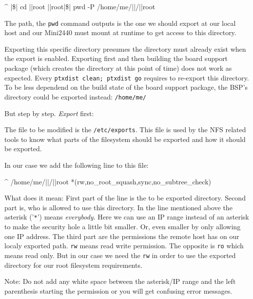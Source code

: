 \begin{ptxshell}[escapechar=|]{^}
|\$| cd |\ptxdistPlatformDir |root
|\ptxdistPlatformDir |root|\$| pwd -P
/home/me/|\ptxdistBSPName |/|\ptxdistPlatformDir |root
\end{ptxshell}

The path, the \texttt{pwd} command outputs is the one we should export at our local
host and our Mini2440 must mount at runtime to get access to this directory.

\begin{important}
Exporting this specific directory presumes the directory must already exist when the export
is enabled. Exporting first and then building the board support package (which creates the
directory at this point of time) does not work as expected. Every \texttt{ptxdist clean; ptxdist go}
requires to re-export this directory.\\
To be less dependend on the build state of the board support package, the BSP's directory
could be exported instead: \texttt{/home/me/\ptxdistBSPName }
\end{important}

But step by step. \textit{Export} first:

The file to be modified is the \texttt{/etc/exports}. This file is used by the NFS related
tools to know what parts of the filesystem should be exported and how it should be exported.

In our case we add the following line to this file:

\begin{ptxshell}[escapechar=|]{^}
/home/me/|\ptxdistBSPName |/|\ptxdistPlatformDir |root *(rw,no_root_squash,sync,no_subtree_check)
\end{ptxshell}

What does it mean: First part of the line is the to be exported directory. Second part is,
who is allowed to use this directory. In the line mentioned above the asterisk ('\texttt{*}')
means \textit{everybody}. Here we can use an IP range instead of an asterisk to make the
security hole a little bit smaller. Or, even smaller by only allowing one IP address.
The third part are the permissions the remote host has
on our localy exported path. \texttt{rw} means read write permission. The opposite is
\texttt{ro} which means read only. But in our case we need the \texttt{rw} in order to use
the exported directory for our root filesystem requirements.

Note: Do not add any white space between the asterisk/IP range and the left parenthesis
starting the permission or you will get confusing error messages.

